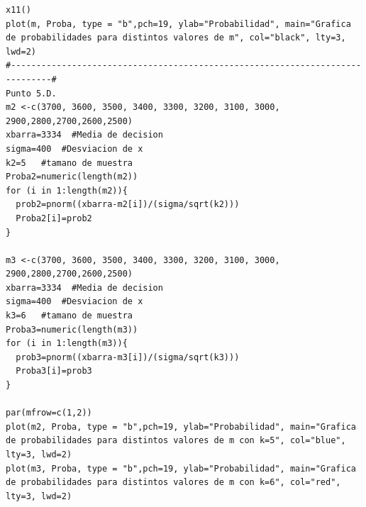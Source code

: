 \documentclass[letterpaper,12pt,onecolumn,titlepage]{article}
\begin{document}
\begin{verbatim}
x11()
plot(m, Proba, type = "b",pch=19, ylab="Probabilidad", main="Grafica de probabilidades para distintos valores de m", col="black", lty=3, lwd=2) 
#------------------------------------------------------------------------------#
Punto 5.D.
m2 <-c(3700, 3600, 3500, 3400, 3300, 3200, 3100, 3000, 2900,2800,2700,2600,2500)
xbarra=3334  #Media de decision
sigma=400  #Desviacion de x
k2=5   #tamano de muestra
Proba2=numeric(length(m2))
for (i in 1:length(m2)){
  prob2=pnorm((xbarra-m2[i])/(sigma/sqrt(k2)))
  Proba2[i]=prob2
}

m3 <-c(3700, 3600, 3500, 3400, 3300, 3200, 3100, 3000, 2900,2800,2700,2600,2500)
xbarra=3334  #Media de decision
sigma=400  #Desviacion de x
k3=6   #tamano de muestra
Proba3=numeric(length(m3))
for (i in 1:length(m3)){
  prob3=pnorm((xbarra-m3[i])/(sigma/sqrt(k3)))
  Proba3[i]=prob3
}

par(mfrow=c(1,2))
plot(m2, Proba, type = "b",pch=19, ylab="Probabilidad", main="Grafica de probabilidades para distintos valores de m con k=5", col="blue", lty=3, lwd=2) 
plot(m3, Proba, type = "b",pch=19, ylab="Probabilidad", main="Grafica de probabilidades para distintos valores de m con k=6", col="red", lty=3, lwd=2) 

\end{verbatim}


\end{document}
